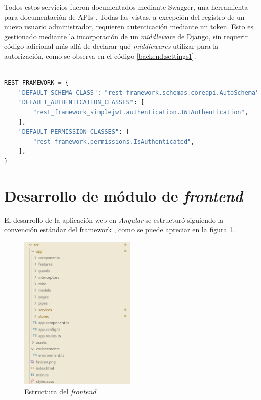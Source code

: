 Todos estos servicios fueron documentados mediante Swagger, una herramienta para documentación de APIs \citep{DJANGO:6}. Todas las vistas, a excepción del registro de un nuevo usuario administrador, requieren autenticación mediante un token. Esto es gestionado mediante la incorporación de un \textit{middleware} de Django, sin requerir código adicional más allá de declarar qué \textit{middlewares} utilizar para la autorización, como se observa en el código \ref{backend:settings1}.

\pagebreak

\begin{lstlisting}[language=Python,label=backend:settings1,caption=Configuración de \textit{middlewares} para la autenticación de la API.]  % Start your code-block

REST_FRAMEWORK = {
    "DEFAULT_SCHEMA_CLASS": "rest_framework.schemas.coreapi.AutoSchema",
    "DEFAULT_AUTHENTICATION_CLASSES": [
        "rest_framework_simplejwt.authentication.JWTAuthentication",
    ],
    "DEFAULT_PERMISSION_CLASSES": [
        "rest_framework.permissions.IsAuthenticated",
    ],
}

\end{lstlisting}

\section{Desarrollo de módulo de \textit{frontend}}

El desarrollo de la aplicación web en \textit{Angular} se estructuró siguiendo la convención estándar del framework \citep{ANGULAR:4}, como se puede apreciar en la figura \ref{frontend:folder}.

\begin{figure}[H]
	\centering
	\includegraphics[width=0.5\textwidth]{./Figures/frontend-folder.png}
	\caption{Estructura del \textit{frontend}.}
	\label{frontend:folder}
\end{figure}

